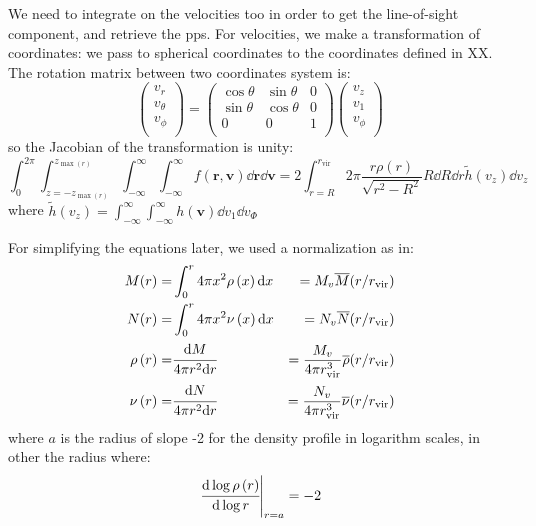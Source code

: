We need to integrate on the velocities too in order to get the line-of-sight
component, and retrieve the pps. For velocities, we make a transformation of
coordinates: we pass to spherical coordinates to the coordinates defined in
XX\@. The rotation matrix between two coordinates system is:
\begin{equation}
    \begin{pmatrix}
        v_r \\
        v_\theta \\
        v_\phi \\
    \end{pmatrix}
    =
    \begin{pmatrix}
        \cos\theta & \sin\theta & 0 \\
        \sin\theta & \cos\theta & 0 \\
        0 & 0 & 1 \\
    \end{pmatrix}
    \begin{pmatrix}
        v_z \\
        v_1 \\
        v_\phi \\
    \end{pmatrix}
\end{equation}
%
so the Jacobian of the transformation is unity:
%
\begin{equation}
    \label{eq:intintfunc}
    \int_0^{2\pi}\int_{z=-z_{\max\left(r\right)}}^{z_{\max\left(r\right)}}
    \int_{-\infty}^\infty\int_{-\infty}^\infty
    f\left(\textbf{r},\textbf{v}\right)\dd\textbf{r}\dd\textbf{v}=
    2\int_{r=R}^{r_{\mathrm{vir}}}2\pi
    \frac{r\rho\left(r\right)}{\sqrt{r^2-R^2}}R\dd{R}\dd{r}
    \tilde{h}\left(v_z\right)\dd{v_z}
\end{equation}
%
where $\tilde{h} \left(v_z\right) = \int_{-\infty}^\infty\int_{-\infty}^\infty
h \left(\textbf{v}\right)\dd v_1 \dd v_\Phi$

For simplifying the equations later, we used a normalization as in:
%
\begin{eqnarray}
    M(r)= &\int_0^r 4\pi x^2\rho \left(x\right){\rm{d}} x
        &=M_v{\overline{M}{(r/r_{\rm vir})}}\nonumber\\
    N(r)= &\int_0^r 4\pi x^2\nu \left(x\right){\rm{d}} x
        &=N_v{\overline{N}{(r/r_{\rm vir})}}\nonumber\\
    \rho\left(r\right)= &\cfrac{{\rm{d}} M}{4\pi r^2{\rm{d}} r}&=\frac{M_v}{4\pi r_{\rm vir}^3}
        \overline\rho(r/r_{\rm vir})\nonumber\\
    \nu\left(r\right)= &\cfrac{{\rm{d}} N}{4\pi r^2{\rm{d}} r}&=
        \frac{N_v}{4\pi r_{\rm vir}^3}\overline\nu (r/r_{\rm vir})\nonumber\\
\end{eqnarray}
%
where $a$ is the radius of slope -2 for the density profile in logarithm
scales, in other the radius where:
%
\begin{equation}
    {\left.\cfrac{{\rm{d}}\log \rho \left(r\right)}{{\rm{d}}\log r}\right|}_{r=a} = -2
\end{equation}

